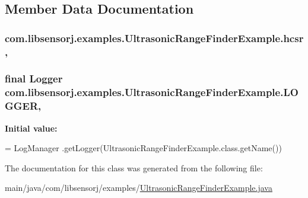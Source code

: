 \subsection{Member Data Documentation}
\hypertarget{classcom_1_1libsensorj_1_1examples_1_1UltrasonicRangeFinderExample_af4703590c0c8bce89386204ea46afc76}{}
\subsubsection[{hcsr}]{ com.\+libsensorj.\+examples.\+Ultrasonic\+Range\+Finder\+Example.\+hcsr\hspace{0.3cm}{\ttfamily [static]}, {\ttfamily [private]}}\label{classcom_1_1libsensorj_1_1examples_1_1UltrasonicRangeFinderExample_af4703590c0c8bce89386204ea46afc76}
\hypertarget{classcom_1_1libsensorj_1_1examples_1_1UltrasonicRangeFinderExample_ac1d433a89455addc211f404fe522f0ec}{}
\subsubsection[{L\+O\+G\+G\+E\+R}]{\setlength{\rightskip}{0pt plus 5cm}final Logger com.\+libsensorj.\+examples.\+Ultrasonic\+Range\+Finder\+Example.\+L\+O\+G\+G\+E\+R\hspace{0.3cm}{\ttfamily [static]}, {\ttfamily [private]}}\label{classcom_1_1libsensorj_1_1examples_1_1UltrasonicRangeFinderExample_ac1d433a89455addc211f404fe522f0ec}
{\bfseries Initial value\+:}
\begin{DoxyCode}
= LogManager
            .getLogger(UltrasonicRangeFinderExample.class.getName())
\end{DoxyCode}


The documentation for this class was generated from the following file\+:\begin{DoxyCompactItemize}
\item 
main/java/com/libsensorj/examples/\hyperlink{UltrasonicRangeFinderExample_8java}{Ultrasonic\+Range\+Finder\+Example.\+java}\end{DoxyCompactItemize}

